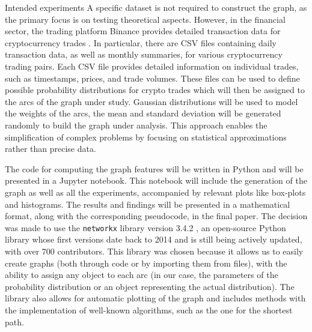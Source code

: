 \begin{projsection}{Intended experiments}
A specific dataset is not required to construct the graph, as the primary focus is on testing theoretical aspects. However, in the financial sector, the trading platform Binance provides detailed transaction data for cryptocurrency trades \cite{Binance}.
In particular, there are CSV files containing daily transaction data, as well as monthly summaries, for various cryptocurrency trading pairs. Each CSV file provides detailed information on individual trades, such as timestamps, prices, and trade volumes. These files can be used to define possible probability distributions for crypto trades which will then be assigned to the arcs of the graph under study.
Gaussian distributions will be used to model the weights of the arcs, the mean and standard deviation will be generated randomly to build the graph under analysis. This approach enables the simplification of complex problems by focusing on statistical approximations rather than precise data.

The code for computing the graph features will be written in Python and will be presented in a Jupyter notebook. This notebook will include the generation of the graph as well as all the experiments, accompanied by relevant plots like box-plots and histograms. The results and findings will be presented in a mathematical format, along with the corresponding pseudocode, in the final paper. 
The decision was made to use the \texttt{networkx} library version 3.4.2 \cite{Networkx}, an open-source Python library whose first versions date back to 2014 and is still being actively updated, with over 700 contributors. This library was chosen because it allows us to easily create graphs (both through code or by importing them from files), with the ability to assign any object to each arc (in our case, the parameters of the probability distribution or an object representing the actual distribution). The library also allows for automatic plotting of the graph and includes methods with the implementation of well-known algorithms, such as the one for the shortest path.

\end{projsection}